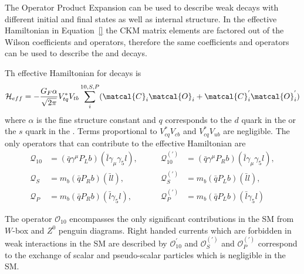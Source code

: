 {{The Operator Product Expansion can be used to describe weak decays with different initial and final states as well as internal structure. In the effective Hamiltonian in Equation~\ref{} the CKM matrix elements are factored out of the Wilson coefficients and operators, therefore the same coefficients and operators can be used to describe the \bd and \bs decays.

Th effective Hamiltonian for \bmumu decays is
\begin{equation}
\mathcal{H}_{eff} = -\frac{G_F \alpha}{\sqrt{2\pi}} V_{tq}^{*}V_{tb} \displaystyle\sum_{i}^{10,S,P} (\matcal{C}_i\matcal{O}_i + \matcal{C}^{'}_{i}\matcal{O}_{i}^{'})
\label{eq:eff_hamil_bmumu}
\end{equation}
where $\alpha$ is the fine structure constant and $q$ corresponds to the $d$ quark in the \bd or the $s$ quark in the \bs. Terms proportional to $V^*_{cq}V_{cb}$ and $V^*_{cq}V_{ub}$ are negligible. The only operators that can contribute to the \bmumu effective Hamiltonian are
\begin{align}
 \mathcal{Q}_{10}&=(\bar{q}\gamma^{\mu}P_{L}b)(\bar{l}\gamma_{\mu}\gamma_{5}l), &\qquad
 \mathcal{Q}_{10}^{(')}&= (\bar{q}\gamma^{\mu}P_{R}b)(\bar{l}\gamma_{\mu}\gamma_{5}l), \\
 \mathcal{Q}_{S}&= m_{b}(\bar{q}P_{R}b)(\bar{l}l),  &\qquad
\mathcal{Q}_{S}^{(')}&= m_{b}(\bar{q}P_{L}b)(\bar{l}l), \\
 \mathcal{Q}_{P}&= m_{b}(\bar{q}P_{R}b)(\bar{l}\gamma_{5}l), &\qquad
 \mathcal{Q}_{P}^{(')}&= m_{b}(\bar{q}P_{L}b)(\bar{l}\gamma_{5}l)
\end{align}


The operator $\mathcal{O}_{10}$ encompasses the only significant contributions in the SM from $W$-box and $Z^0$ penguin diagrams. 
Right handed currents which are forbidden in weak interactions in the SM are described by $\mathcal{O}_{10}^'$ and $\mathcal{O}_{S}^{(')}$ and $\mathcal{O}_{P}^{(')}$ correspond to the exchange of scalar and pseudo-scalar particles which is negligible in the SM. 

}}
